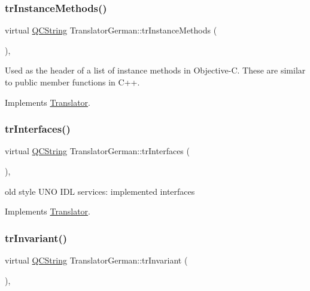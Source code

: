\subsubsection{\texorpdfstring{trInstanceMethods()}{trInstanceMethods()}}
{\footnotesize\ttfamily virtual \mbox{\hyperlink{class_q_c_string}{Q\+C\+String}} Translator\+German\+::tr\+Instance\+Methods (\begin{DoxyParamCaption}{ }\end{DoxyParamCaption})\hspace{0.3cm}{\ttfamily [inline]}, {\ttfamily [virtual]}}

Used as the header of a list of instance methods in Objective-\/C. These are similar to public member functions in C++. 

Implements \mbox{\hyperlink{class_translator}{Translator}}.

\mbox{\label{class_translator_german_a9fc0ad1d0d44872be880cfa290045741}} 
\subsubsection{\texorpdfstring{trInterfaces()}{trInterfaces()}}
{\footnotesize\ttfamily virtual \mbox{\hyperlink{class_q_c_string}{Q\+C\+String}} Translator\+German\+::tr\+Interfaces (\begin{DoxyParamCaption}{ }\end{DoxyParamCaption})\hspace{0.3cm}{\ttfamily [inline]}, {\ttfamily [virtual]}}

old style U\+NO I\+DL services\+: implemented interfaces 

Implements \mbox{\hyperlink{class_translator}{Translator}}.

\mbox{\label{class_translator_german_a78b7055649369f973724178f54a802c8}} 
\subsubsection{\texorpdfstring{trInvariant()}{trInvariant()}}
{\footnotesize\ttfamily virtual \mbox{\hyperlink{class_q_c_string}{Q\+C\+String}} Translator\+German\+::tr\+Invariant (\begin{DoxyParamCaption}{ }\end{DoxyParamCaption})\hspace{0.3cm}{\ttfamily [inline]}, {\ttfamily [virtual]}}

